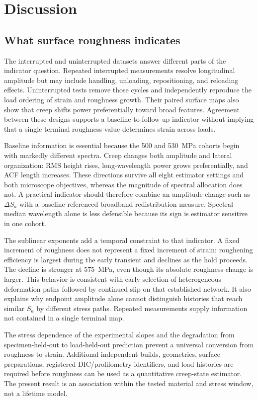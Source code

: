 \documentclass[final,12pt]{cas-sc}
\begin{document}
\FloatBarrier

\section{Discussion}

\subsection{What surface roughness indicates}

The interrupted and uninterrupted datasets answer different parts of the indicator question. Repeated interrupted measurements resolve longitudinal amplitude but may include handling, unloading, repositioning, and reloading effects. Uninterrupted tests remove those cycles and independently reproduce the load ordering of strain and roughness growth. Their paired surface maps also show that creep shifts power preferentially toward broad features. Agreement between these designs supports a baseline-to-follow-up indicator without implying that a single terminal roughness value determines strain across loads.

Baseline information is essential because the 500 and 530~MPa cohorts begin with markedly different spectra. Creep changes both amplitude and lateral organization: RMS height rises, long-wavelength power grows preferentially, and ACF length increases. These directions survive all eight estimator settings and both microscope objectives, whereas the magnitude of spectral allocation does not. A practical indicator should therefore combine an amplitude change such as $\Delta S_a$ with a baseline-referenced broadband redistribution measure. Spectral median wavelength alone is less defensible because its sign is estimator sensitive in one cohort.

The sublinear exponents add a temporal constraint to that indicator. A fixed
increment of roughness does not represent a fixed increment of strain:
roughening efficiency is largest during the early transient and declines as
the hold proceeds. The decline is stronger at 575~MPa, even though its
absolute roughness change is larger. This behavior is consistent with early
selection of heterogeneous deformation paths followed by continued slip on
that established network. It also explains why endpoint amplitude alone
cannot distinguish histories that reach similar $S_a$ by different stress
paths. Repeated measurements supply information not contained in a single
terminal map.

The stress dependence of the experimental slopes and the degradation from specimen-held-out to load-held-out prediction prevent a universal conversion from roughness to strain. Additional independent builds, geometries, surface preparations, registered DIC/profilometry identifiers, and load histories are required before roughness can be used as a quantitative creep-state estimator. The present result is an association within the tested material and stress window, not a lifetime model.
\end{document}
